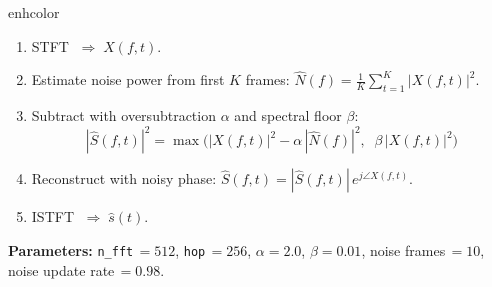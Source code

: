 \documentclass[11pt,a4paper]{article}
\begin{document}
\begin{modulebox}{enhcolor}
\begin{enumerate}[nosep]
\item STFT $\;\Rightarrow\; X(f,t)$.
\item Estimate noise power from first $K$ frames: $\hat{N}(f) = \tfrac{1}{K}\sum_{t=1}^{K}|X(f,t)|^2$.
\item Subtract with oversubtraction $\alpha$ and spectral floor $\beta$:
\begin{equation}
|\hat{S}(f,t)|^2 = \max\!\Big(|X(f,t)|^2 - \alpha\,|\hat{N}(f)|^2,\;\;\beta\,|X(f,t)|^2\Big)
\end{equation}
\item Reconstruct with noisy phase: $\hat{S}(f,t) = |\hat{S}(f,t)|\,e^{j\angle X(f,t)}$.
\item ISTFT $\;\Rightarrow\; \hat{s}(t)$.
\end{enumerate}

\noindent\textbf{Parameters:} \texttt{n\_fft}$\,=512$, \texttt{hop}$\,=256$, $\alpha=2.0$, $\beta=0.01$, noise frames$\,=10$, noise update rate$\,=0.98$.
\end{modulebox}
\end{document}
